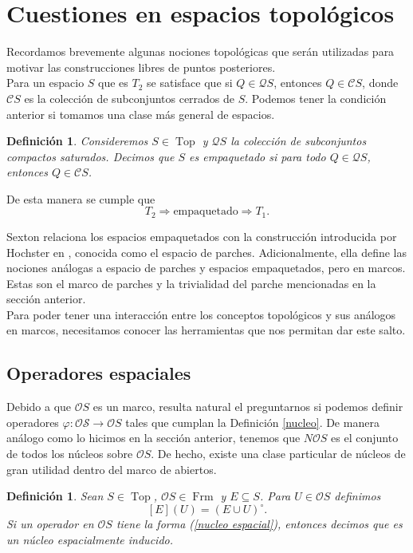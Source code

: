 \documentclass[12pt]{article}
\newtheorem{dfn}[thm]{Definición}
\DeclareMathOperator{\Frm}{Frm}
\DeclareMathOperator{\Top}{Top}
\begin{document}
\section{Cuestiones en espacios topológicos}\label{Topologia}
Recordamos brevemente algunas nociones topológicas que serán utilizadas para motivar las construcciones libres de puntos posteriores.\\

Para un espacio $S$ que es $T_2$ se satisface que si $Q\in \mathcal{Q}S$, entonces $Q\in \mathcal{C}S$, donde $\mathcal{C}S$ es la colección
de subconjuntos cerrados de $S$. Podemos tener la condición anterior si tomamos una clase más general de espacios.

\begin{dfn}\label{empaquetado}
Consideremos $S\in \Top$ y $\mathcal{Q}S$ la colección de subconjuntos compactos saturados. Decimos que $S$ es \emph{empaquetado}
si para todo $Q\in \mathcal{Q}S$, entonces $Q\in \mathcal{C}S$.
\end{dfn}

De esta manera se cumple que
\[
T_2\Rightarrow \text{empaquetado}\Rightarrow T_1.
\]

Sexton relaciona los espacios empaquetados con la construcción introducida por Hochster en \cite{hochster1969prime}, conocida como el espacio de parches. Adicionalmente, 
ella define las nociones análogas a espacio de parches y espacios empaquetados, pero en marcos. Estas son el marco de parches y la trivialidad del parche mencionadas en la sección anterior.\\

Para poder tener una interacción entre los conceptos topológicos y sus análogos en marcos, necesitamos conocer las herramientas 
que nos permitan dar este salto.


\subsection{Operadores espaciales}
Debido a que $\mathcal{O}S$ es un marco, resulta natural el preguntarnos si podemos definir operadores 
$\varphi\colon \mathcal{OS}\to \mathcal{O}S$ tales que cumplan la Definición \ref{nucleo}. De manera análogo como lo hicimos en la sección 
anterior, tenemos que $N\mathcal{O}S$ es el conjunto de todos los núcleos sobre $\mathcal{O}S$. De hecho, existe una clase particular de núcleos 
de gran utilidad dentro del marco de abiertos.
\begin{dfn}\label{Nespacial}
Sean $S\in \Top$, $\mathcal{O}S\in \Frm$ y $E\subseteq S$. Para $U\in \mathcal{O}S$ definimos
\begin{equation}\label{nucleo espacial}
[E](U)=(E\cup U)^\circ.
\end{equation}
Si un operador en $\mathcal{O}S$ tiene la forma (\ref{nucleo espacial}), entonces decimos que es un \emph{núcleo espacialmente inducido}.
\end{dfn}
\end{document}
